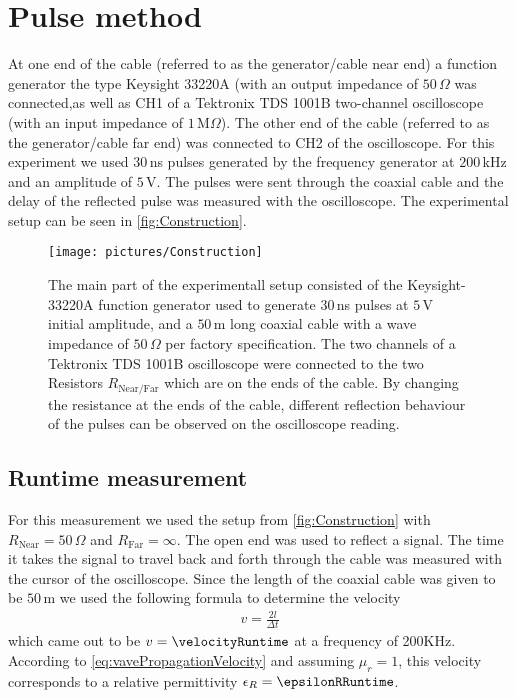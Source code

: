 \documentclass[a4paper,10pt,twocolumn]{article}
\begin{document}
    \section{Pulse method}
    At one end of the cable (referred to as the generator/cable near end) a function generator the type Keysight 33220A (with an output impedance of $50\,\Omega$
    was connected,as well as CH1 of a Tektronix TDS 1001B two-channel oscilloscope
    (with an input impedance of $1\,\text{M}\Omega$).
    The other end of the cable (referred to as the generator/cable far end) was connected to CH2 of the oscilloscope.
    For this experiment we used $30\,$ns pulses generated by the frequency generator at $200\,$kHz and an amplitude of $5\,$V\@.
    The pulses were sent through the coaxial cable and the delay of the reflected pulse was measured with the oscilloscope.
    The experimental setup can be seen in \autoref{fig:Construction}.
    \label{sec:propagationVelocities}
    \begin{figure}[htbp]                                 %
        \begin{center}                                       %
            \texttt{[image: pictures/Construction]}      %
            \caption[]{The main part of the experimentall setup consisted of the Keysight-33220A function generator used to generate $30\,$ns pulses at $5\,$V initial amplitude, and a $50\,$m long
            coaxial cable with a wave impedance of $50\,\Omega$ per factory specification.
            The two channels of a Tektronix TDS 1001B oscilloscope were connected to the two Resistors $R_{\text{Near/Far}}$ which are on the ends of the cable.
            By changing the resistance at the ends of the cable, different reflection behaviour of the pulses can be observed on the oscilloscope reading.
            }   %
            \label{fig:Construction}                                      %
        \end{center}
    \end{figure}
    \subsection{Runtime measurement}
    \label{subsec:runtimeMeasurement}
    For this measurement we used the setup from \autoref{fig:Construction} with $R_{\text{Near}}=50\,\Omega$ and $R_{\text{Far}}=\infty$.
    The open end was used to reflect a signal.
    The time it takes the signal to travel back and forth through the cable was measured with the cursor of the oscilloscope.
    Since the length of the coaxial cable was given to be $50\,$m we used the following formula to determine the velocity
    \begin{align}
        \label{eq:runtimeVelocity}
        v=\frac{2l}{\Delta t}
    \end{align}
    which came out to be $v = \velocityRuntime$ at a frequency of 200KHz.
    According to \autoref{eq:vavePropagationVelocity} and assuming $\mu_r = 1$, this velocity corresponds to a relative permittivity $\epsilon_R = \epsilonRRuntime$.
    
\end{document}
